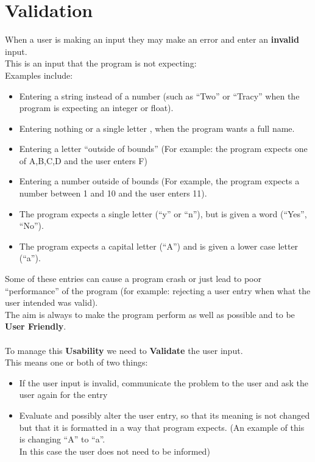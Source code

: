 \documentclass[a4paper,12pt]{article}
\begin{document}
\section{Validation}
When a user is making an input they may make an error and enter an \textbf{invalid} input.\\
This is an input that the program is not expecting:\\
Examples include:
\begin{itemize}
	\item Entering a string instead of a number (such as ``Two'' or ``Tracy'' when the program is expecting an integer or float).
	\item Entering nothing or a single letter , when the program wants a full name.
	\item Entering a letter ``outside of bounds'' (For example: the program expects one of A,B,C,D and the user enters F)
	\item Entering a number outside of bounds (For example, the program expects a number between 1 and 10 and the user enters 11).
	\item The program expects a single letter (``y'' or ``n''), but is given a word (``Yes'', ``No'').
	\item The program expects a capital letter (``A'') and is given a lower case letter (``a'').
\end{itemize}
Some of these entries can cause a program crash or just lead to poor ``performance'' of the program (for example: rejecting a user entry when what the user intended was valid).\\
The aim is always to make the program perform as well as possible and to be \textbf{User Friendly}.\\\\
To manage this \textbf{Usability} we need to \textbf{Validate} the user input.\\
This means one or both of two things:
\begin{itemize}
	\item If the user input is invalid, communicate the problem to the user and ask the user again for the entry
	\item Evaluate and possibly alter the user entry, so that its meaning is not changed but that it is formatted in a way that program expects. (An example of this is changing ``A'' to ``a''. \\ In this case the user does not need to be informed)
\end{itemize}
\end{document}
